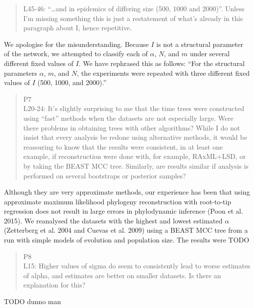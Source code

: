 \documentclass[12pt]{letter}
\begin{document}
\begin{letter}{ }
\begin{quote}
  \itshape

  L45-46: “…and in epidemics of differing size (500, 1000 and 2000)”. Unless
  I’m missing something this is just a restatement of what’s already in this
  paragraph about I, hence repetitive. 
\end{quote}

We apologise for the misunderstanding. Because $I$ is not a structural
parameter of the network, we attempted to classify each of $\alpha$, $N$, and
$m$ under several different fixed values of $I$. We have rephrased this as
follows: ``For the structural parameters $\alpha$, $m$, and $N$, the
experiments were repeated with three different fixed values of $I$ (500, 1000,
and 2000).''

\begin{quote}
  \itshape

  P7 \\
  L20-24: It’s slightly surprising to me that the time trees were constructed
  using “fast” methods when the datasets are not especially large. Were there
  problems in obtaining trees with other algorithms? While I do not insist that
  every analysis be redone using alternative methods, it would be reassuring to
  know that the results were consistent, in at least one example, if
  reconstruction were done with, for example, RAxML+LSD, or by taking the BEAST
  MCC tree. Similarly, are results similar if analysis is performed on several
  bootstraps or posterior samples?
\end{quote}

Although they are very approximate methods, our experience has been that using
approximate maximum likelihood phylogeny reconstruction with root-to-tip
regression does not result in large errors in phylodynamic inference (Poon et
al. 2015). We reanalysed the datasets with the highest and lowest estimated
$\alpha$ (Zetterberg et al. 2004 and Cuevas et al. 2009) using a BEAST MCC tree 
from a run with simple models of evolution and population size. The results
were TODO


\begin{quote}
  \itshape

  P8 \\
  L15: Higher values of sigma do seem to consistently lead to worse estimates
  of alpha, and estimates are better on smaller datasets. Is there an
  explanation for this?
\end{quote}

TODO dunno man


\end{letter}
\end{document}
